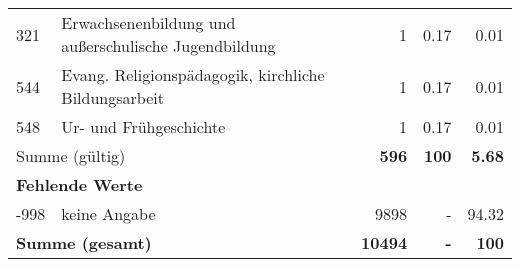 \begin{longtable}{lXrrr}
        321 & \multicolumn{1}{X}{Erwachsenenbildung und außerschulische Jugendbildung} & %
          \num{1} &
          \num[round-mode=places,round-precision=2]{0.17} &
          \num[round-mode=places,round-precision=2]{0.01} \\

        544 & \multicolumn{1}{X}{Evang. Religionspädagogik, kirchliche Bildungsarbeit} & %
          \num{1} &
          \num[round-mode=places,round-precision=2]{0.17} &
          \num[round-mode=places,round-precision=2]{0.01} \\

        548 & \multicolumn{1}{X}{Ur- und Frühgeschichte} & %
          \num{1} &
          \num[round-mode=places,round-precision=2]{0.17} &
          \num[round-mode=places,round-precision=2]{0.01} \\

     \midrule
     \multicolumn{2}{l}{Summe (gültig)} &
       \textbf{\num{596}} &
     \textbf{\num{100}} &
       \textbf{\num[round-mode=places,round-precision=2]{5.68}} \\
     \multicolumn{5}{l}{\textbf{Fehlende Werte}}\\
       -998 &
       keine Angabe &
         \num{9898} &
        - &
         \num[round-mode=places,round-precision=2]{94.32} \\
     \midrule
     \multicolumn{2}{l}{\textbf{Summe (gesamt)}} &
          \textbf{\num{10494}} &
        \textbf{-} &
        \textbf{\num{100}} \\
     \bottomrule
     \end{longtable}
     
